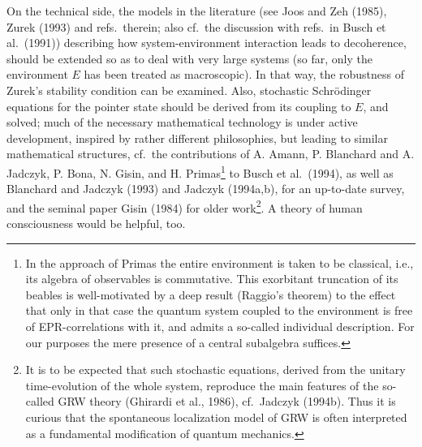 \documentclass[12pt,titlepage]{article}
\newcommand{\fn}{\footnote}
\renewcommand{\sp}{\samepage}
\begin{document}
On the technical side, the models in the literature (see Joos and Zeh (1985),
Zurek (1993) and refs.\
therein; also cf.\ the discussion with refs.\ in   Busch et al.\ (1991))
describing how
system-environment interaction leads to decoherence, should be extended so as
to deal with very large
systems (so far, only the environment $E$ has been treated as macroscopic). In
that way, the
robustness of Zurek's stability condition can be examined. Also, stochastic
Schr\"{o}dinger equations
for the pointer state should be derived from its coupling to $E$, and solved;
much of the necessary
mathematical technology is under active development,  inspired by rather
different
philosophies, but leading to similar mathematical structures, cf.\ the
contributions of A. Amann, P.
Blanchard and A. Jadczyk, P. Bona, N. Gisin, and H. Primas\fn{{\sp  In the
approach of
Primas the entire environment is
taken to be classical, i.e., its algebra of observables is commutative. This
exorbitant truncation of
its beables is well-motivated by a deep result (Raggio's theorem) to the effect
that only in that case
the quantum system coupled to the environment is free of EPR-correlations with
it, and admits a
so-called individual description. For our purposes the mere presence of a
central subalgebra
suffices.}} to Busch et al.\ (1994), as
well as Blanchard and Jadczyk (1993) and  Jadczyk (1994a,b),
 for an up-to-date survey, and the seminal paper Gisin (1984) for older
work\fn{ {\sp  It
is to be expected that such stochastic equations, derived from the unitary
time-evolution of the
whole system,  reproduce the main features of the so-called GRW theory
(Ghirardi et al., 1986),
cf.\ Jadczyk (1994b).
Thus  it is curious that the spontaneous localization model of GRW is often
interpreted as a
fundamental modification of quantum mechanics.}}.   A theory
of human consciousness would be helpful, too.
\end{document}
